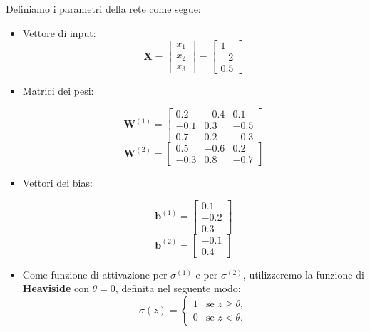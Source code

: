 Definiamo i parametri della rete come segue:
\begin{itemize}
    \item Vettore di input: 
    \[\mathbf{X} = \begin{bmatrix} x_1 \\ x_2 \\ x_3 \end{bmatrix} =\begin{bmatrix} 1 \\ -2 \\ 0.5 \end{bmatrix}\]


    \item Matrici dei pesi: 
    \begin{multicols}{2}
        {
            \[
                \mathbf{W}^{(1)} = 
                \begin{bmatrix}
                    0.2 & -0.4 & 0.1 \\
                    -0.1 & 0.3 & -0.5 \\
                    0.7 & 0.2 & -0.3
                \end{bmatrix}
            \]
        }
        {
            \[
                \mathbf{W}^{(2)} = 
                \begin{bmatrix}
                    0.5 & -0.6 & 0.2 \\
                    -0.3 & 0.8 & -0.7
                \end{bmatrix}
            \]
        }
    \end{multicols}
    
    \item Vettori dei bias: 
    \begin{multicols}{2}
        {\[\mathbf{b}^{(1)} = \begin{bmatrix} 0.1 \\ -0.2 \\ 0.3 \end{bmatrix}\]}
        {\[\mathbf{b}^{(2)} = \begin{bmatrix} -0.1 \\ 0.4 \end{bmatrix}\]}
    \end{multicols}

    
    \item Come funzione di attivazione per $\sigma^{(1)}$ e per $\sigma^{(2)}$, utilizzeremo la funzione di \textbf{Heaviside} 
    con $\theta = 0$, definita nel seguente modo:
    \[
        \sigma(z) = 
        \begin{cases} 
        1 & \text{se } z \geq \theta, \\
        0 & \text{se } z < \theta.
        \end{cases}
    \]
\end{itemize}

